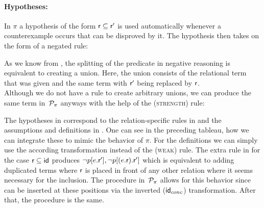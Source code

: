 \documentclass[a4paper,twoside,12pt, english]{article}
\begin{document}
\newpage
\paragraph{Hypotheses:}
In $\pi$ a hypothesis of the form $\textsf{\upshape r} \subseteq \textsf{\upshape r}'$ is used automatically whenever a counterexample occurs that can be disproved by it. The hypothesis then takes on the form of a negated rule:
\begin{mathpar} 
\end{mathpar} 
As we know from , the splitting of the predicate in negative reasoning is equivalent to creating a union. Here, the union consists of the relational term that was given and the same term with $\textsf{\upshape r}'$ being replaced by $\textsf{\upshape r}$. \\
Although we do not have a rule to create arbitrary unions, we can produce the same term in~$\mathcal{P}_\pi$ anyways with the help of the (\textsc{strength}) rule:
\begin{mathpar}
\end{mathpar}
The hypotheses in \cite{Gru+26} correspond to the relation-specific rules in  and the assumptions and definitions in . One can see in the preceding tableau, how we can integrate these to mimic the behavior of $\pi$. For the definitions we can simply use the according transformation instead of the (\textsc{weak}) rule.
The extra rule in \cite{Gru+26} for the case $\textsf{\upshape r} \subseteq \textsf{\upshape id}$ produces $\neg p[e.\textsf{\upshape r}'], \neg p[(e.\textsf{\upshape r}).\textsf{\upshape r}']$ which is equivalent to adding duplicated terms where $\textsf{\upshape r}$ is placed in front of any other relation where it seems necessary for the inclusion. The procedure in~$\mathcal{P}_\pi$ allows for this behavior since \id{} can be inserted at these positions via the inverted ($\textsf{\upshape id}_{conc}$) transformation. After that, the procedure is the same. \\
\end{document}
